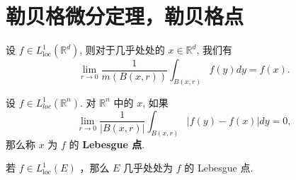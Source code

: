 \section{勒贝格微分定理，勒贝格点}

\begin{theorem}[勒贝格微分定理]
设 $f \in L_{\mathrm{loc}}^{1}\left(\mathbb{R}^{d}\right)$, 则对于几乎处处的 $x \in \mathbb{R}^{d}$, 我们有
\[
\lim _{r \rightarrow 0} \frac{1}{m(B(x, r))} \int_{B(x, r)} f(y) d y=f(x) .
\]
\end{theorem}
\begin{definition}[Lebesgue 点]
设 $f \in L_{loc}^1\left(\mathbb{R}^n\right)$. 对 $\mathbb{R}^n$ 中的 $x$, 如果
\[
\lim _{r \rightarrow 0} \frac{1}{|B(x, r)|} \int_{B(x, r)}|f(y)-f(x)| d y=0,
\]那么称 $x$ 为 $f$ 的 \textbf{Lebesgue 点}.
\end{definition}
若 $f\in L^{1}_{\text{loc}}(E)$ ，那么 $E$ 几乎处处为 $f$ 的 Lebesgue 点.
